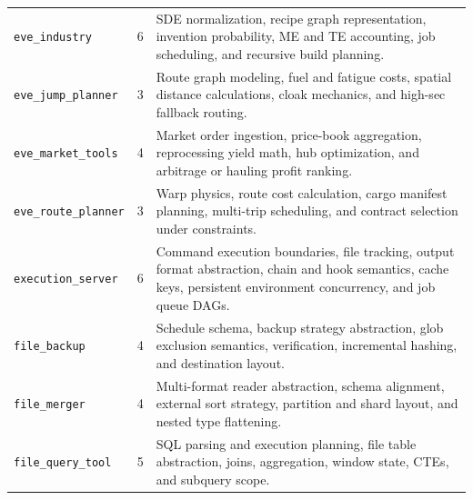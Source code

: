 \begin{table}[t]
\begin{tabularx}{\textwidth}{@{}l c >{\raggedright\arraybackslash}X@{}}
\texttt{eve\_industry} & 6 & SDE normalization, recipe graph representation, invention probability, ME and TE accounting, job scheduling, and recursive build planning. \\
\texttt{eve\_jump\_planner} & 3 & Route graph modeling, fuel and fatigue costs, spatial distance calculations, cloak mechanics, and high-sec fallback routing. \\
\texttt{eve\_market\_tools} & 4 & Market order ingestion, price-book aggregation, reprocessing yield math, hub optimization, and arbitrage or hauling profit ranking. \\
\texttt{eve\_route\_planner} & 3 & Warp physics, route cost calculation, cargo manifest planning, multi-trip scheduling, and contract selection under constraints. \\
\texttt{execution\_server} & 6 & Command execution boundaries, file tracking, output format abstraction, chain and hook semantics, cache keys, persistent environment concurrency, and job queue DAGs. \\
\texttt{file\_backup} & 4 & Schedule schema, backup strategy abstraction, glob exclusion semantics, verification, incremental hashing, and destination layout. \\
\texttt{file\_merger} & 4 & Multi-format reader abstraction, schema alignment, external sort strategy, partition and shard layout, and nested type flattening. \\
\texttt{file\_query\_tool} & 5 & SQL parsing and execution planning, file table abstraction, joins, aggregation, window state, CTEs, and subquery scope. \\
\bottomrule
\end{tabularx}
\end{table}

